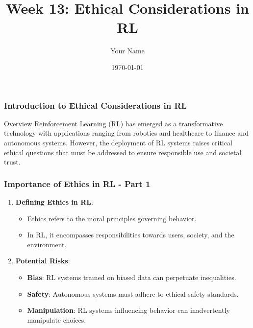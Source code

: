 \documentclass{beamer}
\title{Week 13: Ethical Considerations in RL}
\author{Your Name}
\institute{Your Institution}
\date{\today}
\begin{document}
\frame{\titlepage}

\begin{frame}[fragile]
    \frametitle{Introduction to Ethical Considerations in RL}
    \begin{block}{Overview}
        Reinforcement Learning (RL) has emerged as a transformative technology with applications ranging from robotics and healthcare to finance and autonomous systems. However, the deployment of RL systems raises critical ethical questions that must be addressed to ensure responsible use and societal trust.
    \end{block}
\end{frame}

\begin{frame}[fragile]
    \frametitle{Importance of Ethics in RL - Part 1}
    \begin{enumerate}
        \item \textbf{Defining Ethics in RL}:
        \begin{itemize}
            \item Ethics refers to the moral principles governing behavior.
            \item In RL, it encompasses responsibilities towards users, society, and the environment.
        \end{itemize}
        
        \item \textbf{Potential Risks}:
        \begin{itemize}
            \item \textbf{Bias}: RL systems trained on biased data can perpetuate inequalities.
            \item \textbf{Safety}: Autonomous systems must adhere to ethical safety standards.
            \item \textbf{Manipulation}: RL systems influencing behavior can inadvertently manipulate choices.
        \end{itemize}
    \end{enumerate}
\end{frame}
\end{document}
